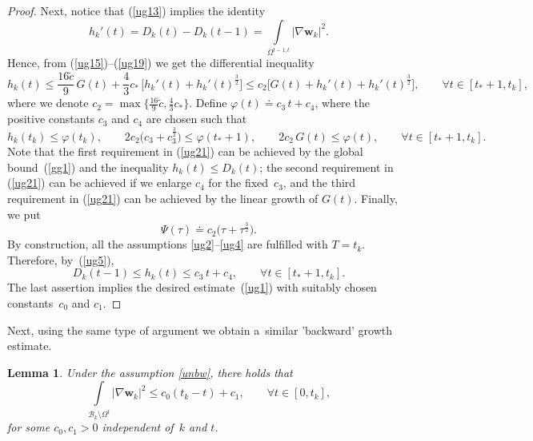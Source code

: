 \documentclass[11pt]{article}
\newtheorem{lemma}[theorem]{Lemma}
\numberwithin{equation}{section}
\numberwithin{figure}{section}
\def\cc{{\tilde c}}
\def\vp{{\varphi}}
\def\we{{\mathbf w}}
\begin{document}
\begin{proof}
Next, notice that (\ref{ug13}) implies the identity
	\begin{equation}\label{ug19}h_k'(t)=D_k(t)-D_k(t-1)=\int\limits_{\Omega^{t-1,t}}|\nabla\we_k|^2.
	\end{equation}
	Hence, from (\ref{ug15})--(\ref{ug19}) we get the differential inequality
	\begin{equation}\label{ug20}
		h_k(t)\le\frac{16 \cc}9 \,G(t)+\frac43c_*\,\biggl[h_k'(t)+h_k'(t)^\frac32\biggr]\le c_2\biggl[G(t)+h_k'(t)+h_k'(t)^\frac32\biggr],\qquad \forall t \in [t_* + 1, t_k],\end{equation}
	where we denote
	$c_2=\max\bigl\{\frac{16}9 \cc, \frac43c_*\bigr\}$.
Define $\varphi(t)\doteq c_3\,t +c_4$, where the positive constants $c_3$ and $c_4$ are chosen such that
\begin{equation}\label{ug21}
h_k(t_k)\le\vp(t_k),\qquad 2c_2 \bigl(c_3+c_3^\frac32\bigr)\le\vp(t_*+1),\qquad 2c_2\,G(t)\le \vp(t),\qquad\forall t\in[t_*+1,t_k].\end{equation}
Note that the first requirement in (\ref{ug21}) can be achieved by the global bound~(\ref{gg1}) and the inequality $h_k(t)\le D_k(t)$; the second requirement in (\ref{ug21}) can be achieved if we enlarge $c_4$ for the fixed~$c_3$, and the third requirement in (\ref{ug21}) can be achieved by the linear growth of $G(t)$. Finally, we put
	$$\Psi(\tau)\doteq c_2\bigl(\tau+\tau^\frac32\bigr).$$
	By construction, all the assumptions \eqref{ug2}--\eqref{ug4}  are fulfilled with $T=t_k$. Therefore, by~(\ref{ug5}),
	$$D_k(t-1)\le h_k(t)\le c_3\,t+c_4,\qquad\forall t\in[t_*+1, t_k].$$
The last assertion implies the desired estimate~(\ref{ug1}) with suitably chosen constants~$c_0$ and $c_1$.\end{proof}

Next, using the same type of argument we obtain a~similar 'backward' growth estimate.

\begin{lemma} \label{lem:62}
	Under the assumption \eqref{unbw}, there holds that
	\begin{equation}\label{ug1--}
		\int\limits_{ \mathcal{B}_k \setminus \Omega^t}|\nabla\we_k|^2\le c_0 (t_k-t)+c_1, \qquad \forall t \in [0, t_k],
	\end{equation}
for some $c_0, c_1>0$ independent of~$k$ and $t$.
\end{lemma}
\end{document}
